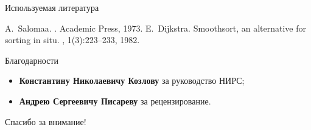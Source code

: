 \documentclass{beamer}
\begin{document}
\begin{frame}{Используемая литература}
\begin{thebibliography}{Dijkstra, 1982}
        A.~Salomaa.
        .
        \newblock Academic Press, 1973.
        E.~Dijkstra.
        \newblock Smoothsort, an alternative for sorting in situ.
        , 1(3):223--233, 1982.
\end{thebibliography}
\end{frame}

\begin{frame}{Благодарности}
    \begin{itemize}
        \item \textbf{Константину Николаевичу Козлову}
            за руководство НИРС;
        \item \textbf{Андрею Сергеевичу Писареву}
            за рецензирование.
    \end{itemize}
    \bigskip

    \begin{center}
        \LARGE Спасибо за внимание!
    \end{center}
\end{frame}
\end{document}
